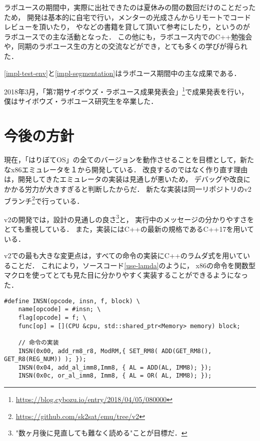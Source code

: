 \documentclass[10pt,a4j]{jsarticle}
\begin{document}
ラボユースの期間中，実際に出社できたのは夏休みの間の数回だけのことだったため，
開発は基本的に自宅で行い，メンターの光成さんからリモートでコードレビューを頂いたり，
\cite{read-486}や\cite{effective-cpp}などの書籍を貸して頂いて参考にしたり，というのがラボユースでの主な活動となった．
この他にも，ラボユース内でのC++勉強会や，同期のラボユース生の方との交流などができ，とても多くの学びが得られた．

\ref{impl-test-env}と\ref{impl-segmentation}はラボユース期間中の主な成果である．

2018年3月，「第7期サイボウズ・ラボユース成果発表会」\footnote{\url{https://blog.cybozu.io/entry/2018/04/05/080000}}で成果発表を行い，
僕はサイボウズ・ラボユース研究生を卒業した．

\section{今後の方針}

現在，「はりぼてOS」の全てのバージョンを動作させることを目標として，新たなx86エミュレータを１から開発している．
改良するのではなく作り直す理由は，開発してきたエミュレータの実装は見通しが悪いため，
デバッグや改良にかかる労力が大きすぎると判断したからだ．
新たな実装は同一リポジトリのv2ブランチ\footnote{\url{https://github.com/sk2sat/emu/tree/v2}}で行っている．

v2の開発では，設計の見通しの良さ\footnote{"数ヶ月後に見直しても難なく読める"ことが目標だ．}と，
実行中のメッセージの分かりやすさをとても重視している．
また，実装にはC++の最新の規格であるC++17を用いている．

v2での最も大きな変更点は，すべての命令の実装にC++のラムダ式を用いていることだ．
これにより，ソースコード\ref{use-lamda}のように，
x86の命令を関数型マクロを使ってとても見た目に分かりやすく実装することができるようになった．

\begin{lstlisting}[caption=ラムダ式を使った命令の実装の一部,label=use-lamda]
#define INSN(opcode, insn, f, block) \
	name[opcode] = #insn; \
	flag[opcode] = f; \
	func[op] = [](CPU &cpu, std::shared_ptr<Memory> memory) block;

	// 命令の実装
	INSN(0x00, add_rm8_r8, ModRM,{ SET_RM8( ADD(GET_RM8(), GET_R8(REG_NUM)) ); });
	INSN(0x04, add_al_imm8,Imm8, { AL = ADD(AL, IMM8); });
	INSN(0x0c, or_al_imm8, Imm8, { AL = OR( AL, IMM8); });
\end{lstlisting}

\end{document}
